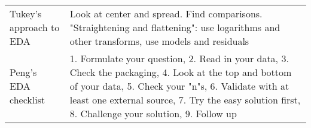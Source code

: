 \documentclass[a4paper,8pt,twocolumn]{extarticle}
\begin{document}
\begin{table}[h]
{\begin{tabular}{p{0.2\linewidth} | p{0.8\linewidth}}
Tukey's approach to EDA                         & Look at center and spread. Find comparisons. "Straightening and   flattening": use logarithms and other transforms, use models and   residuals                                                                                                                          \\
Peng's EDA checklist                            & 1. Formulate your question, 2. Read in your data, 3. Check the packaging,   4. Look at the top and bottom of your data, 5. Check your "n"s, 6.   Validate with at least one external source, 7. Try the easy solution first,   8. Challenge your solution, 9. Follow up
\end{tabular}%
}
\end{table}

\begin{table}[h]
\end{table}
\end{document}
